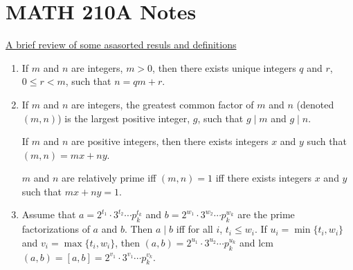 \documentclass[12pt]{article}
\theoremstyle{definition}
\theoremstyle{definition}
\begin{document}
\section{MATH 210A Notes}
  \noindent\underline{A brief review of some asasorted resuls and definitions}
    \begin{enumerate}
      \item If $m$ and $n$ are integers, $m>0$, then there exists unique
        integers $q$ and $r$, $0\leq r<m$, such that $n=qm+r$.
      \item If $m$ and $n$ are integers, the greatest common factor of $m$ and
        $n$ (denoted $(m,n)$) is the largest positive integer, $g$, such that
        $g\mid m$ and $g\mid n$.\par\hspace{4mm} If $m$ and $n$ are positive
        integers, then there exists integers $x$ and $y$ such that
        $(m,n)=mx+ny$.\par\hspace{4mm} $m$ and $n$ are relatively prime iff
        $(m, n)=1$ iff there exists integers $x$ and $y$ such that $mx+ny=1$.
      \item Assume that $a=2^{t_1}\cdot3^{t_2}\cdots p_k^{t_k}$ and
        $b=2^{w_1}\cdot3^{w_2}\cdots p_k^{w_k}$ are the prime factorizations of
        $a$ and $b$. Then $a\mid b$ iff for all $i$, $t_i\leq w_i$. If
        $u_i=\min\{t_i, w_i\}$ and $v_i=\max\{t_i, w_i\}$, then $(a,
        b)=2^{u_1}\cdot 3^{u_2}\cdots p_k^{u_k}$ and lcm$(a, b)=[a,
        b]=2^{v_1}\cdot 3^{v_1}\cdots p_k^{v_k}$.
    \end{enumerate}
\end{document}
